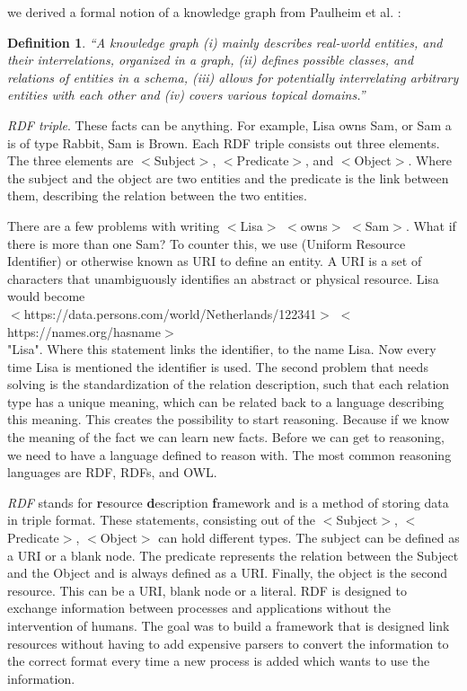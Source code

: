 \documentclass[11pt,letterpaper ,oneside ]{book}
\newtheorem{definition}{Definition}
\begin{document}
	we derived a formal notion of a knowledge graph from Paulheim et al. \cite{HeikoP:2016}:
	\begin{definition} 
		“A knowledge graph (i) mainly describes real-world entities, and their interrelations, organized in a graph, (ii) defines possible classes, and relations of entities in a schema, (iii) allows for potentially interrelating arbitrary entities with each other and (iv) covers various topical domains.”
	\end{definition}
	
	\textit{RDF triple}. These facts can be anything. For example, Lisa owns Sam, or Sam a is of type Rabbit, Sam is Brown. Each RDF triple consists out three elements.
	The three elements are $<$Subject$>$, $<$Predicate$>$, and $<$Object$>$. Where the subject and the object are two entities and the predicate is the link between them, describing the relation between the two entities. 
	
	There are a few problems with writing $<$Lisa$>$ $<$owns$>$ $<$Sam$>$. What if there is more than one Sam? To counter this, we use (Uniform Resource Identifier) or otherwise known as URI to define an entity. A URI is a set of characters that unambiguously identifies an abstract or physical resource. Lisa would become \\$<$https://data.persons.com/world/Netherlands/122341$>$ $<$https://names.org/hasname$>$ \\ "Lisa". Where this statement links the identifier, to the name Lisa. Now every time Lisa is mentioned the identifier is used. 
	The second problem that needs solving is the standardization of the relation description, such that each relation type has a unique meaning, which can be related back to a language describing this meaning. This creates the possibility to start reasoning. Because if we know the meaning of the fact we can learn new facts. Before we can get to reasoning, we need to have a language defined to reason with. The most common reasoning languages are RDF, RDFs, and OWL.
	
	\textit{RDF} \cite{rdfPrimer:2014} stands for \textbf{r}esource \textbf{d}escription \textbf{f}ramework and is a method of storing data in triple format. These statements, consisting out of the $<$Subject$>$, $<$Predicate$>$, $<$Object$>$ can hold different types. The subject can be defined as a URI or a blank node. The predicate represents the relation between the Subject and the Object and is always defined as a URI. Finally, the object is the second resource. This can be a URI, blank node or a literal.
	RDF is designed to exchange information between processes and applications without the intervention of humans. The goal was to build a framework that is designed link resources without having to add expensive parsers to convert the information to the correct format every time a new process is added which wants to use the information.\\
\end{document}
